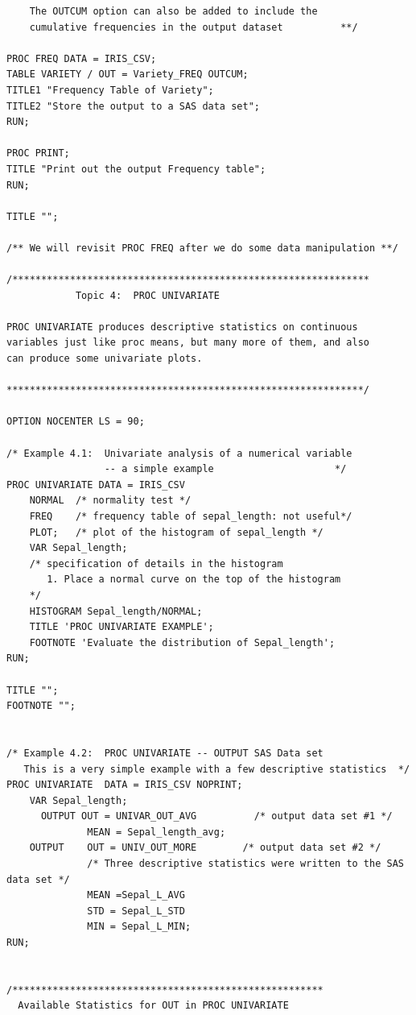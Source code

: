 \documentclass[
]{book}
\begin{document}
\begin{verbatim}
    The OUTCUM option can also be added to include the 
    cumulative frequencies in the output dataset          **/

PROC FREQ DATA = IRIS_CSV;
TABLE VARIETY / OUT = Variety_FREQ OUTCUM;
TITLE1 "Frequency Table of Variety";
TITLE2 "Store the output to a SAS data set";
RUN;

PROC PRINT;
TITLE "Print out the output Frequency table";
RUN;

TITLE "";

/** We will revisit PROC FREQ after we do some data manipulation **/

/**************************************************************
            Topic 4:  PROC UNIVARIATE

PROC UNIVARIATE produces descriptive statistics on continuous 
variables just like proc means, but many more of them, and also 
can produce some univariate plots.

**************************************************************/

OPTION NOCENTER LS = 90;

/* Example 4.1:  Univariate analysis of a numerical variable
                 -- a simple example                     */
PROC UNIVARIATE DATA = IRIS_CSV 
    NORMAL  /* normality test */
    FREQ    /* frequency table of sepal_length: not useful*/
    PLOT;   /* plot of the histogram of sepal_length */
    VAR Sepal_length;
    /* specification of details in the histogram
       1. Place a normal curve on the top of the histogram
    */
    HISTOGRAM Sepal_length/NORMAL;
    TITLE 'PROC UNIVARIATE EXAMPLE';
    FOOTNOTE 'Evaluate the distribution of Sepal_length';
RUN;

TITLE "";
FOOTNOTE "";


/* Example 4.2:  PROC UNIVARIATE -- OUTPUT SAS Data set     
   This is a very simple example with a few descriptive statistics  */
PROC UNIVARIATE  DATA = IRIS_CSV NOPRINT;
    VAR Sepal_length;
      OUTPUT OUT = UNIVAR_OUT_AVG          /* output data set #1 */
              MEAN = Sepal_length_avg;
    OUTPUT    OUT = UNIV_OUT_MORE        /* output data set #2 */
              /* Three descriptive statistics were written to the SAS data set */
              MEAN =Sepal_L_AVG        
              STD = Sepal_L_STD
              MIN = Sepal_L_MIN;
RUN;


/******************************************************
  Available Statistics for OUT in PROC UNIVARIATE


\end{verbatim}
\end{document}
